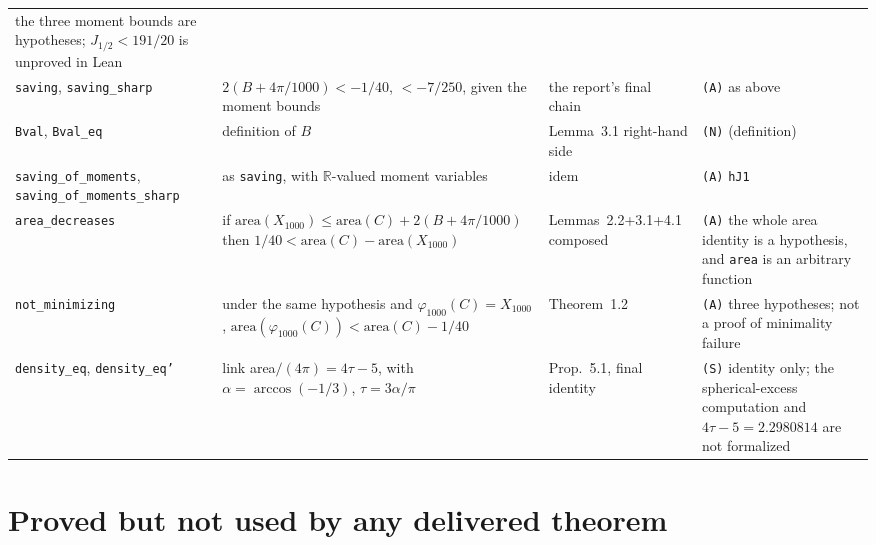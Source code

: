 \documentclass[11pt]{article}
\newcommand{\Ln}[1]{\texttt{#1}}
\newcommand{\No}{\texttt{(N)}}
\newcommand{\Sc}{\texttt{(S)}}
\newcommand{\As}{\texttt{(A)}}
\begin{document}
{\begin{longtable}{L{3.7cm}L{4.2cm}L{3.4cm}L{4.7cm}}
the three moment bounds are hypotheses; $J_{1/2}<191/20$ is unproved in Lean\\
\Ln{saving}, \Ln{saving\_\allowbreak{}sharp} & $2(B+4\pi/1000)<-1/40$, $<-7/250$, given the moment bounds &
the report's final chain & \As{} as above\\
\Ln{Bval}, \Ln{Bval\_\allowbreak{}eq} & definition of $B$ & Lemma~3.1 right-hand side & \No{} (definition)\\
\Ln{saving\_\allowbreak{}of\_\allowbreak{}moments}, \Ln{saving\_\allowbreak{}of\_\allowbreak{}moments\_\allowbreak{}sharp} & as \Ln{saving}, with
$\mathbb{R}$-valued moment variables & idem & \As{} \Ln{hJ1}\\
\Ln{area\_\allowbreak{}decreases} & if $\mathrm{area}(X_{1000})\le\mathrm{area}(C)+2(B+4\pi/1000)$ then
$1/40<\mathrm{area}(C)-\mathrm{area}(X_{1000})$ & Lemmas~2.2+3.1+4.1 composed & \As{} the whole
area identity is a hypothesis, and \Ln{area} is an arbitrary function\\
\Ln{not\_\allowbreak{}minimizing} & under the same hypothesis and $\varphi_{1000}(C)=X_{1000}$,
$\mathrm{area}(\varphi_{1000}(C))<\mathrm{area}(C)-1/40$ & Theorem~1.2 & \As{} three hypotheses;
not a proof of minimality failure\\
\Ln{density\_\allowbreak{}eq}, \Ln{density\_\allowbreak{}eq'} & link area$/(4\pi)=4\tau-5$, with
$\alpha=\arccos(-1/3)$, $\tau=3\alpha/\pi$ & Prop.~5.1, final identity & \Sc{} identity only; the
spherical-excess computation and $4\tau-5=2.2980814$ are not formalized\\
\bottomrule
\end{longtable}
}

\section{Proved but not used by any delivered theorem}
\label{app:unused}
\end{document}
